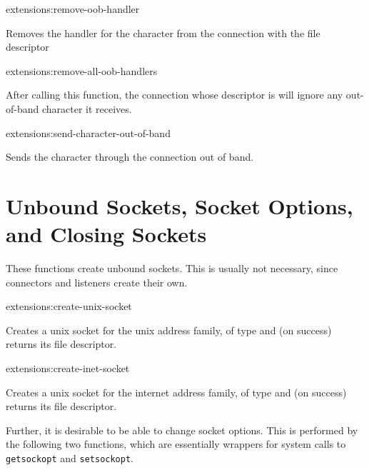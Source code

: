 \begin{defun}{extensions:}{remove-oob-handler}{%
    }
  
  Removes the handler for the character  from the connection
  with the file descriptor 

\end{defun}

\begin{defun}{extensions:}{remove-all-oob-handlers}{%
    }

  After calling this function, the connection whose descriptor is
   will ignore any out-of-band character it receives.

\end{defun}

\begin{defun}{extensions:}{send-character-out-of-band}{%
    }

  Sends the character  through the connection  out
  of band.

\end{defun}

\section{Unbound Sockets, Socket Options, and Closing Sockets}

These functions create unbound sockets. This is usually not necessary,
since connectors and listeners create their own.

\begin{defun}{extensions:}{create-unix-socket}{%
    }
  
  Creates a unix socket for the unix address family, of type
   and (on success) returns its file descriptor.

\end{defun}

\begin{defun}{extensions:}{create-inet-socket}{%
    }
  
  Creates a unix socket for the internet address family, of type
   and (on success) returns its file descriptor.

\end{defun}

Further, it is desirable to be able to change socket options. This is
performed by the following two functions, which are essentially
wrappers for system calls to {\tt getsockopt} and {\tt setsockopt}.

